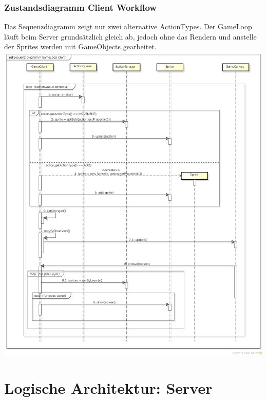 \documentclass[11pt]{scrartcl}
\begin{document}
\newpage

\subsubsection{Zustandsdiagramm Client Workflow}
Das Sequenzdiagramm zeigt nur zwei alternative ActionTypes. Der GameLoop läuft beim Server grundsätzlich gleich ab, jedoch ohne das Rendern und anstelle der Sprites werden mit GameObjects gearbeitet.\\
\includegraphics[scale=0.4]{SequenzDiagrammGameLoopClient}

\newpage

\section{Logische Architektur: Server}
\end{document}
